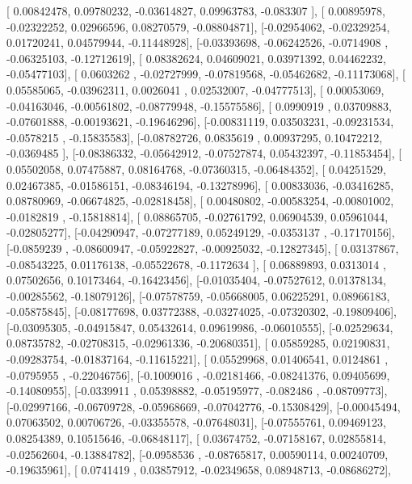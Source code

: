 \documentclass{article}
\begin{document}
       [ 0.00842478,  0.09780232, -0.03614827,  0.09963783, -0.083307  ],
       [ 0.00895978, -0.02322252,  0.02966596,  0.08270579, -0.08804871],
       [-0.02954062, -0.02329254,  0.01720241,  0.04579944, -0.11448928],
       [-0.03393698, -0.06242526, -0.0714908 , -0.06325103, -0.12712619],
       [ 0.08382624,  0.04609021,  0.03971392,  0.04462232, -0.05477103],
       [ 0.0603262 , -0.02727999, -0.07819568, -0.05462682, -0.11173068],
       [ 0.05585065, -0.03962311,  0.0026041 ,  0.02532007, -0.04777513],
       [ 0.00053069, -0.04163046, -0.00561802, -0.08779948, -0.15575586],
       [ 0.0990919 ,  0.03709883, -0.07601888, -0.00193621, -0.19646296],
       [-0.00831119,  0.03503231, -0.09231534, -0.0578215 , -0.15835583],
       [-0.08782726,  0.0835619 ,  0.00937295,  0.10472212, -0.0369485 ],
       [-0.08386332, -0.05642912, -0.07527874,  0.05432397, -0.11853454],
       [ 0.05502058,  0.07475887,  0.08164768, -0.07360315, -0.06484352],
       [ 0.04251529,  0.02467385, -0.01586151, -0.08346194, -0.13278996],
       [ 0.00833036, -0.03416285,  0.08780969, -0.06674825, -0.02818458],
       [ 0.00480802, -0.00583254, -0.00801002, -0.0182819 , -0.15818814],
       [ 0.08865705, -0.02761792,  0.06904539,  0.05961044, -0.02805277],
       [-0.04290947, -0.07277189,  0.05249129, -0.0353137 , -0.17170156],
       [-0.0859239 , -0.08600947, -0.05922827, -0.00925032, -0.12827345],
       [ 0.03137867, -0.08543225,  0.01176138, -0.05522678, -0.1172634 ],
       [ 0.06889893,  0.0313014 ,  0.07502656,  0.10173464, -0.16423456],
       [-0.01035404, -0.07527612,  0.01378134, -0.00285562, -0.18079126],
       [-0.07578759, -0.05668005,  0.06225291,  0.08966183, -0.05875845],
       [-0.08177698,  0.03772388, -0.03274025, -0.07320302, -0.19809406],
       [-0.03095305, -0.04915847,  0.05432614,  0.09619986, -0.06010555],
       [-0.02529634,  0.08735782, -0.02708315, -0.02961336, -0.20680351],
       [ 0.05859285,  0.02190831, -0.09283754, -0.01837164, -0.11615221],
       [ 0.05529968,  0.01406541,  0.0124861 , -0.0795955 , -0.22046756],
       [-0.1009016 , -0.02181466, -0.08241376,  0.09405699, -0.14080955],
       [-0.0339911 ,  0.05398882, -0.05195977, -0.082486  , -0.08709773],
       [-0.02997166, -0.06709728, -0.05968669, -0.07042776, -0.15308429],
       [-0.00045494,  0.07063502,  0.00706726, -0.03355578, -0.07648031],
       [-0.07555761,  0.09469123,  0.08254389,  0.10515646, -0.06848117],
       [ 0.03674752, -0.07158167,  0.02855814, -0.02562604, -0.13884782],
       [-0.0958536 , -0.08765817,  0.00590114,  0.00240709, -0.19635961],
       [ 0.0741419 ,  0.03857912, -0.02349658,  0.08948713, -0.08686272],
\end{document}
